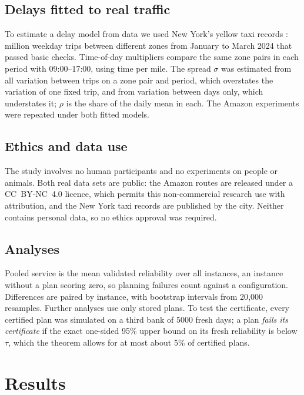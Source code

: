 \documentclass[11pt,a4paper]{article}
\theoremstyle{remark}
\begin{document}
\subsection{Delays fitted to real traffic}\label{sec:nyc}

To estimate a delay model from data we used New York's yellow taxi records
\citep{nyctlc2024}: \NycTripsM{} million weekday trips between different zones from
January to March 2024 that passed basic checks. Time-of-day multipliers compare the same
zone pairs in each period with 09:00--17:00, using time per mile. The spread $\sigma$
was estimated from all variation between trips on a zone pair and period, which
overstates the variation of one fixed trip, and from variation between days only,
which understates it; $\rho$ is the share of the daily mean in each. The Amazon
experiments were repeated under both fitted models.

\subsection{Ethics and data use}

The study involves no human participants and no experiments on people or
animals. Both real data sets are public: the Amazon routes are released under a
CC~BY-NC~4.0 licence, which permits this non-commercial research use with
attribution, and the New York taxi records are published by the city. Neither
contains personal data, so no ethics approval was required.

\subsection{Analyses}

Pooled service is the mean validated reliability over all instances, an instance
without a plan scoring zero, so planning failures count against a configuration.
Differences are paired by instance, with bootstrap intervals from 20{,}000
resamples. Further analyses use only stored plans. To test the certificate, every
certified plan was simulated on a third bank of 5000 fresh days; a plan \emph{fails its
certificate} if the exact one-sided 95\% upper bound on its fresh reliability is below
$\tau$, which the theorem allows for at most about 5\% of certified plans.

\section{Results}\label{sec:results}
\end{document}
